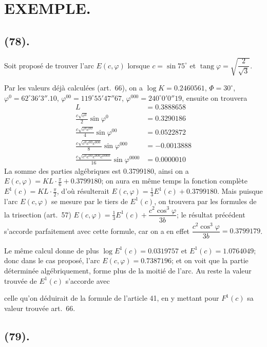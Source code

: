 \documentclass{article}
\begin{document}
\section*{EXEMPLE.}

\subsection*{(78).}

Soit proposé de trouver l'arc $E(c,\varphi)$ lorsque $c=\sin 75^{\circ}$ et $\operatorname{tang}\varphi=\sqrt{\dfrac{2}{\sqrt{3}}}$.

Par les valeurs déjà calculées (art.~66), on a $\log K=0.2460561$, $\Phi=30^{\circ}$, $\varphi^{0}=62^{\circ}36'3''.10$, $\varphi^{00}=119^{\circ}55'47''67$, $\varphi^{000}=240^{\circ}0'0''19$, ensuite on trouvera
\[ \begin{aligned} L&=0.3888658\\ \frac{c\sqrt{c^{0}}}{2}\sin\varphi^{0}&=0.3290186\\ \frac{c\sqrt{c^{0}c^{00}}}{4}\sin\varphi^{00}&=0.0522872\\ \frac{c\sqrt{c^{0}c^{00}c^{000}}}{8}\sin\varphi^{000}&=-0.0013888\\ \frac{c\sqrt{c^{0}c^{00}c^{000}c^{0000}}}{16}\sin\varphi^{0000}&=0.0000010 \end{aligned} \]
La somme des parties algébriques est 0.3799180, ainsi on a $E(c,\varphi)=KL\cdot\frac{\pi}{6}+0.3799180$; on aura en même temps la fonction complète $E^{1}(c)=KL\cdot\frac{\pi}{2}$, d'où résulterait $E(c,\varphi)=\frac{1}{3}E^{1}(c)+0.3799180$. Mais puisque l'arc $E(c,\varphi)$ se mesure par le tiers de $E^{1}(c)$, on trouvera par les formules de la trisection (art.~57) $E(c,\varphi)=\frac{1}{3}E^{1}(c)+\dfrac{c^{2}\cos^{3}\varphi}{3b}$; le résultat précédent s'accorde parfaitement avec cette formule, car on a en effet $\dfrac{c^{2}\cos^{3}\varphi}{3b}=0.3799179$.

Le même calcul donne de plus $\log E^{1}(c)=0.0319757$ et $E^{1}(c)=1.0764049$; donc dans le cas proposé, l'arc $E(c,\varphi)=0.7387196$; et on voit que la partie déterminée algébriquement, forme plus de la moitié de l'arc. Au reste la valeur trouvée de $E^{1}(c)$ s'accorde avec

celle qu'on déduirait de la formule de l'article 41, en y mettant pour $F^{1}(c)$ sa valeur trouvée art.~66.

\subsection*{(79).}
\end{document}
